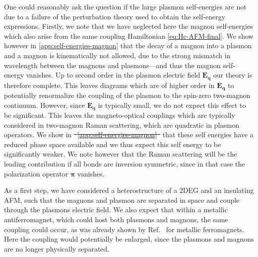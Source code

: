 \documentclass[aps,prb,reprint,twocolumns,superscriptaddress,nofootinbib]{revtex4-2}
\makeatletter
\providecommand{\DIFaddtex}[1]{{\protect\color{blue}\uwave{#1}}} %
\providecommand{\DIFdeltex}[1]{{\protect\color{red}\sout{#1}}} %
\providecommand{\DIFaddbegin}{} %
\providecommand{\DIFaddend}{} %
\providecommand{\DIFdelbegin}{} %
\providecommand{\DIFdelend}{} %
\providecommand{\DIFadd}[1]{\texorpdfstring{\DIFaddtex{#1}}{#1}} %
\providecommand{\DIFdel}[1]{\texorpdfstring{\DIFdeltex{#1}}{}} %
\newcommand{\DIFscaledelfig}{0.5}
\newlength{\DIFdelgraphicswidth} %
\newlength{\DIFdelgraphicsheight} %
\newcommand{\DIFaddincludegraphics}[2][]{{\color{blue}\fbox{\DIFOincludegraphics[#1]{#2}}}} %
\newcommand{\DIFdelincludegraphics}[2][]{%
\sbox{\DIFdelgraphicsbox}{\DIFOincludegraphics[#1]{#2}}%
\settoboxwidth{\DIFdelgraphicswidth}{\DIFdelgraphicsbox} %
\settoboxtotalheight{\DIFdelgraphicsheight}{\DIFdelgraphicsbox} %
\scalebox{\DIFscaledelfig}{%
\parbox[b]{\DIFdelgraphicswidth}{\usebox{\DIFdelgraphicsbox}\\[-\baselineskip] \rule{\DIFdelgraphicswidth}{0em}}\llap{\resizebox{\DIFdelgraphicswidth}{\DIFdelgraphicsheight}{%
\setlength{\unitlength}{\DIFdelgraphicswidth}%
\begin{picture}(1,1)%
\thicklines\linethickness{2pt} %
{\color[rgb]{1,0,0}\put(0,0){\framebox(1,1){}}}%
{\color[rgb]{1,0,0}\put(0,0){\line( 1,1){1}}}%
{\color[rgb]{1,0,0}\put(0,1){\line(1,-1){1}}}%
\end{picture}%
}\hspace*{3pt}}} %
} %
\DeclareRobustCommand{\DIFaddbegin}{\DIFOaddbegin \let\includegraphics\DIFaddincludegraphics} %
\DeclareRobustCommand{\DIFaddend}{\DIFOaddend \let\includegraphics\DIFOincludegraphics} %
\DeclareRobustCommand{\DIFdelbegin}{\DIFOdelbegin \let\includegraphics\DIFdelincludegraphics} %
\DeclareRobustCommand{\DIFdelend}{\DIFOaddend \let\includegraphics\DIFOincludegraphics} %
\let\sout@orig\sout %
\renewcommand{\sout}[1]{\ifmmode\text{\sout@orig{\ensuremath{#1}}}\else\sout@orig{#1}\fi} %
\makeatother
\begin{document}
	One could reasonably ask the question if the large plasmon self-energies are not due to a failure of the perturbation theory used to obtain the self-energy expressions. Firstly, we note that we have neglected here the magnon self-energies which also arise from the same coupling Hamiltonian \cref{eq:Hc-AFM-final}. We show however in \cref{app:self-energies-magnon} that the decay of a magnon into a plasmon and a magnon is kinematically not allowed, due to the strong mismatch in wavelength between the magnons and plasmons---and thus the magnon self-energy vanishes. Up to second order in the plasmon electric field $\bm E_{\bm q}$ our theory is therefore complete. This leaves diagrams which are of higher order in $\bm E_{\bm q}$ to potentially renormalize the coupling of the plasmon to the spin-zero two-magnon continuum. However, since $\bm E_{\bm q}$ is typically small, we do not expect this effect to be significant. This leaves the magneto-optical couplings which are typically considered in two-magnon Raman scattering, which are quadratic in plasmon operators. We show in \DIFdelbegin \DIFdel{\mbox{%
\cref{app:self-energies-magnon} }\hskip0pt%
}\DIFdelend \DIFaddbegin \DIFadd{\mbox{%
\cref{app:magneto-optic} }\hskip0pt%
}\DIFaddend that these self energies have a reduced phase space available and we thus expect this self energy to be significantly weaker. We note however that the Raman scattering will be the leading contribution if all bonds are inversion symmetric, since in that case the polarization operator $\bm \pi$ vanishes.

	
	As a first step, we have considered a heterostructure of a 2DEG and an insulating AFM, such that the magnons and plasmon are separated in space and couple through the plasmons electric field. We also expect that within a metallic antiferromagnet, which could host both plasmons and magnons, the same coupling could occur, as was already shown by Ref.~\cite{ghoshPlasmonmagnonInteractionsTwodimensional2023} for metallic ferromagnets. Here the coupling would potentially be enlarged, since the plasmons and magnons are no longer physically separated.
\end{document}
